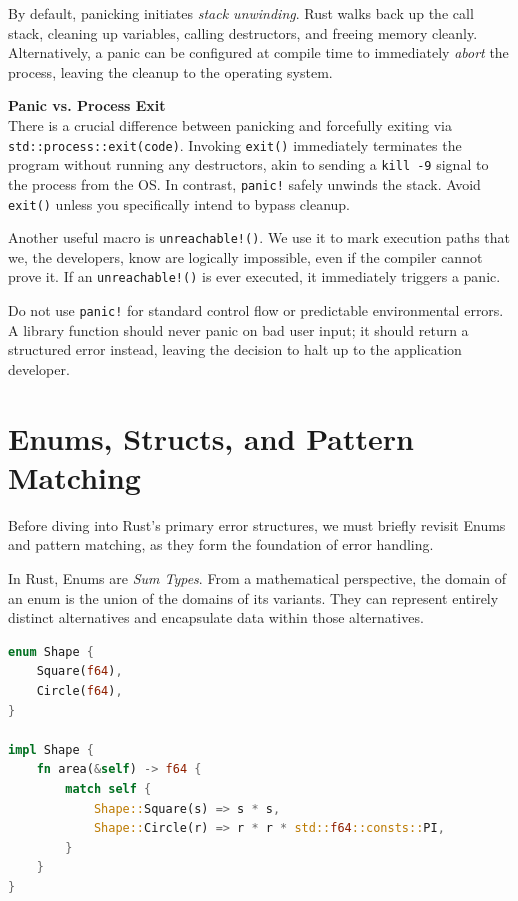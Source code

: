 By default, panicking initiates \emph{stack unwinding}. Rust walks back up the call stack, cleaning up variables, calling destructors, and freeing memory cleanly. Alternatively, a panic can be configured at compile time to immediately \emph{abort} the process, leaving the cleanup to the operating system.

\begin{warningbox}
\textbf{Panic vs. Process Exit}\\
There is a crucial difference between panicking and forcefully exiting via \texttt{std::process::exit(code)}. Invoking \texttt{exit()} immediately terminates the program without running any destructors, akin to sending a \texttt{kill -9} signal to the process from the OS. In contrast, \texttt{panic!} safely unwinds the stack. Avoid \texttt{exit()} unless you specifically intend to bypass cleanup.
\end{warningbox}

Another useful macro is \texttt{unreachable!()}. We use it to mark execution paths that we, the developers, know are logically impossible, even if the compiler cannot prove it. If an \texttt{unreachable!()} is ever executed, it immediately triggers a panic.

\begin{warningbox}
Do not use \texttt{panic!} for standard control flow or predictable environmental errors. A library function should never panic on bad user input; it should return a structured error instead, leaving the decision to halt up to the application developer.
\end{warningbox}

\section{Enums, Structs, and Pattern Matching}

Before diving into Rust's primary error structures, we must briefly revisit Enums and pattern matching, as they form the foundation of error handling.

In Rust, Enums are \emph{Sum Types}. From a mathematical perspective, the domain of an enum is the union of the domains of its variants. They can represent entirely distinct alternatives and encapsulate data within those alternatives.

\begin{lstlisting}[language=Rust]
enum Shape {
    Square(f64),
    Circle(f64),
}

impl Shape {
    fn area(&self) -> f64 {
        match self {
            Shape::Square(s) => s * s,
            Shape::Circle(r) => r * r * std::f64::consts::PI,
        }
    }
}
\end{lstlisting}

